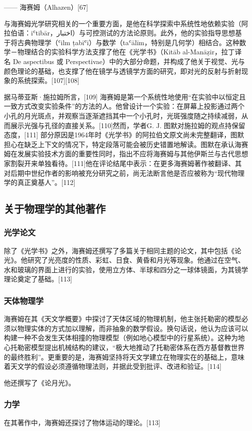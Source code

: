 —— 海赛姆（Alhazen）[67]

与海赛姆光学研究相关的一个重要方面，是他在科学探索中系统性地依赖实验（阿拉伯语：iʿtibār，اختبار）与可控测试的方法论原则。此外，他的实验指导思想基于将古典物理学（ʿilm ṭabīʿī）与数学（taʿālīm，特别是几何学）相结合。这种数学－物理结合的实验科学方法支撑了他在《光学书》（Kitāb al-Manāẓir，拉丁译名 De aspectibus 或 Perspectivae）中的大部分命题，并构成了他关于视觉、光与颜色理论的基础，也支撑了他在镜学与透镜学方面的研究，即对光的反射与折射现象的系统探索。[107][108]

据马蒂亚斯·施拉姆所言，[109] 海赛姆是第一个系统性地使用“在实验中以恒定且一致方式改变实验条件”的方法的人。他曾设计一个实验：在屏幕上投影通过两个小孔的月光斑点，并观察当逐渐遮挡其中一个小孔时，光斑强度随之持续减弱，从而展示光强与孔径的直接关系。[110]然而，学者G. J. 图默对施拉姆的观点持保留态度，[111] 部分原因是1964年时《光学书》的阿拉伯文原文尚未完整翻译，图默担心在缺乏上下文的情况下，特定段落可能会被历史错置地解读。图默在承认海赛姆在发展实验技术方面的重要性同时，指出不应将海赛姆与其他伊斯兰与古代思想家割裂开来单独看待。[111]他在评论结尾中表示：在更多海赛姆著作被翻译、其对后期中世纪作者的影响被充分研究之前，尚无法断言他是否应被称为“现代物理学的真正奠基人”。[112]
\subsection{关于物理学的其他著作}
\subsubsection{光学论文}
除了《光学书》之外，海赛姆还撰写了多篇关于相同主题的论文，其中包括《论光》。他研究了光亮度的性质、彩虹、日食、黄昏和月光等现象。他通过在空气、水和玻璃的界面上进行的实验，使用立方体、半球和四分之一球体镜面，为其镜学理论奠定了基础。[113]
\subsubsection{天体物理学}
海赛姆在其《天文学概要》中探讨了天体区域的物理机制，他主张托勒密的模型必须以物理实体的方式加以理解，而非抽象的数学假设。换句话说，他认为应该可以构建一种不会发生天体相撞的物理模型（例如地心模型中的行星系统）。这种为地心托勒密模型提出机械结构的建议，“极大地推动了托勒密体系在西方基督教世界的最终胜利”。更重要的是，海赛姆坚持将天文学建立在物理实在的基础上，意味着天文学的假设必须遵循物理法则，并据此受到批评、改进和验证。[114]

他还撰写了《论月光》。
\subsubsection{力学}
在其著作中，海赛姆还探讨了物体运动的理论。[113]
